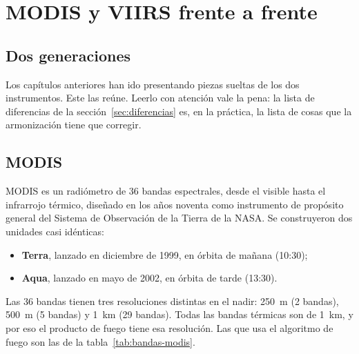 \chapter{MODIS y VIIRS frente a frente}\label{cap:modisviirs}


\section{Dos generaciones}

Los capítulos anteriores han ido presentando piezas sueltas de los dos instrumentos. Este las
reúne. Leerlo con atención vale la pena: la lista de diferencias de la
sección~\ref{sec:diferencias} es, en la práctica, la lista de cosas que la armonización tiene
que corregir.

\section{MODIS}

MODIS es un radiómetro de 36 bandas espectrales, desde el visible hasta el infrarrojo térmico,
diseñado en los años noventa como instrumento de propósito general del Sistema de Observación de
la Tierra de la NASA. Se construyeron dos unidades casi idénticas:

\begin{itemize}
  \item \textbf{Terra}, lanzado en diciembre de 1999, en órbita de mañana (10:30);
  \item \textbf{Aqua}, lanzado en mayo de 2002, en órbita de tarde (13:30).
\end{itemize}

Las 36 bandas tienen tres resoluciones distintas en el nadir: 250~m (2 bandas), 500~m (5
bandas) y 1~km (29 bandas). Todas las bandas térmicas son de 1~km, y por eso el producto de
fuego tiene esa resolución. Las que usa el algoritmo de fuego son las de la
tabla~\ref{tab:bandas-modis}.

